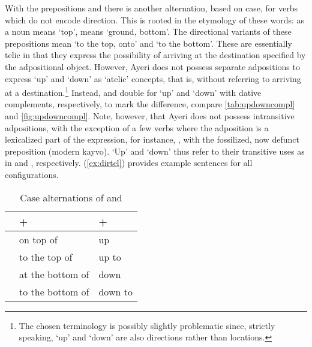 \label{phsec:lingavandat}
With the prepositions  and  there is another alternation, based on case, for verbs which do not
encode direction. This is rooted in the etymology of these words:
 as a noun means `top',  means `ground,
bottom'. The directional variants of these prepositions mean `to the top, onto'
and `to the bottom'. These are essentially telic in that they express the
possibility of arriving at the destination specified by the adpositional
object. However, Ayeri does not possess separate adpositions to express `up'
and `down' as `atelic' concepts, that is, without referring to arriving at a
destination.\footnote{The chosen terminology is possibly slightly problematic
since, strictly speaking, `up' and `down' are also directions rather than
locations.} Instead,  and  double for `up'
and `down' with dative complements, respectively, to mark the difference,
compare \autoref{tab:updowncompl} and \autoref{fig:updowncompl}. Note, however,
that Ayeri does not possess intransitive adpositions, with the exception of a
few verbs where the adposition is a lexicalized part of the expression, for
instance, , with the
fossilized, now defunct preposition 
(modern  {kayvo}). `Up' and `down' thus refer to their transitive
uses as in  and , respectively. 
(\ref{ex:dirtel}) provides example sentences for all configurations.

\begin{table}\centering
\caption{Case alternations of  and }

\begin{tabu} to \linewidth {X X[c] X[c]}
\toprule\tableheaderfont

%
	& +~\Loc
	& +~\Dat
	\\

\toprule

	& on top of
	& up
	\\


	& to the top of
	& up to
	\\

\midrule

	& at the bottom of
	& down
	\\


	& to the bottom of
	& down to
	\\

\bottomrule
\end{tabu}

\label{tab:updowncompl}
\end{table}

